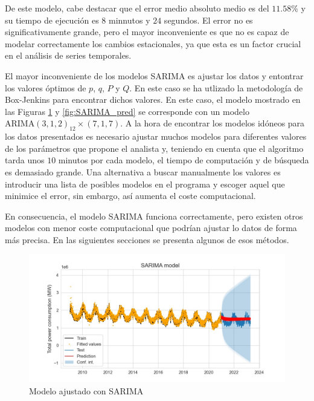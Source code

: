 \documentclass[12pt,twoside]{article}
\newcommand{\arima}{\text{ARIMA}}
\begin{document}
De este modelo, cabe destacar que el error medio absoluto medio es del $11.58\%$ y su tiempo de ejecución es $8$ minnutos y $24$ segundos. El error no es significativamente grande, pero el mayor inconveniente es que no es capaz de modelar correctamente los cambios estacionales, ya que esta es un factor crucial en el análisis de series temporales.

El mayor inconveniente de los modelos SARIMA es ajustar los datos y entontrar los valores óptimos de  $p$, $q$, $P$ y $Q$. En este caso se ha utlizado la metodología de Box-Jenkins para encontrar dichos valores. En este caso, el modelo mostrado en las Figuras \ref{fig:SARIMA} y \ref{fig:SARIMA_pred} se corresponde con un modelo $\arima(3,1,2)_{12}\times(7,1,7)$. A la hora de encontrar los modelos idóneos para los datos presentados es necesario ajustar muchos modelos para diferentes valores de los parámetros que propone el analista y, teniendo en cuenta que el algoritmo tarda unos $10$ minutos por cada modelo, el tiempo de computación y de búsqueda es demasiado grande. Una alternativa a buscar manualmente los valores es introducir una lista de posibles modelos en el programa y escoger aquel que minimice el error, sin embargo, así aumenta el coste computacional.

En consecuencia, el modelo SARIMA funciona correctamente, pero existen otros modelos con menor coste computacional que podrían ajustar lo datos de forma más precisa. En las siguientes secciones se presenta algunos de esos métodos.




\begin{center}
\begin{figure}[h]
    \includegraphics[width = \textwidth]{imagenes/SARIMA.jpg}
    \caption{Modelo ajustado con SARIMA}\label{fig:SARIMA}
\end{figure}
\end{center}
\end{document}
